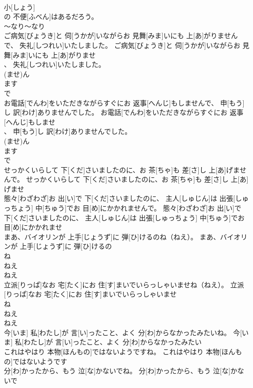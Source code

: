 \documentclass[8pt]{extreport}
\begin{document}
\begin{CJK}{UTF8}{min}
\\	小[しょう]
\\	の 不便[ふべん]はあるだろう。	
\\	～なり～なり
\\	ご病気[びょうき]と 伺[うかが]いながらお 見舞[みま]いにも 上[あ]がりませんで、 失礼[しつれい]いたしました。	ご病気[びょうき]と 伺[うかが]いながらお 見舞[みま]いにも 上[あ]がりませ
\\	、 失礼[しつれい]いたしました。	
\\	(ませ)ん 
\\	ます 
\\	で
\\	お電話[でんわ]をいただきながらすぐにお 返事[へんじ]もしませんで、 申[もう]し 訳[わけ]ありませんでした。	お電話[でんわ]をいただきながらすぐにお 返事[へんじ]もしませ
\\	、 申[もう]し 訳[わけ]ありませんでした。	
\\	(ませ)ん 
\\	ます 
\\	で
\\	せっかくいらして 下[くだ]さいましたのに、お 茶[ちゃ]も 差[さ]し 上[あ]げませんで。	せっかくいらして 下[くだ]さいましたのに、お 茶[ちゃ]も 差[さ]し 上[あ]げませ
\\	態々[わざわざ]お 出[い]で 下[くだ]さいましたのに、 主人[しゅじん]は 出張[しゅっちょう] 中[ちゅう]でお 目[め]にかかれませんで。	態々[わざわざ]お 出[い]で 下[くだ]さいましたのに、 主人[しゅじん]は 出張[しゅっちょう] 中[ちゅう]でお 目[め]にかかれませ
\\	まあ、バイオリンが 上手[じょうず]に 弾[ひ]けるのね（ねえ）。	まあ、バイオリンが 上手[じょうず]に 弾[ひ]けるの
\\	ね 
\\	ねえ 
\\	ねえ 
\\	立派[りっぱ]なお 宅[たく]にお 住[す]まいでいらっしゃいませね（ねえ）。	立派[りっぱ]なお 宅[たく]にお 住[す]まいでいらっしゃいませ
\\	ね 
\\	ねえ 
\\	ねえ 
\\	今[いま] 私[わたし]が 言[い]ったこと、よく 分[わ]からなかったみたいね。	今[いま] 私[わたし]が 言[い]ったこと、よく 分[わ]からなかったみたい
\\	これはやはり 本物[ほんもの]ではないようですね。	これはやはり 本物[ほんもの]ではないようです
\\	分[わ]かったから、もう 泣[な]かないでね。	分[わ]かったから、もう 泣[な]かないで

\end{CJK}
\end{document}
